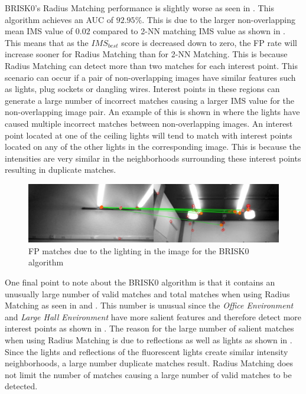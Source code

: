 \documentclass{report}
\begin{document}
BRISK0's Radius Matching performance is slightly worse as seen in . This algorithm achieves an AUC of $92.95\%$. This is due to the larger non-overlapping mean IMS value of $0.02$ compared to 2-NN matching IMS value as shown in . This means that as the $IMS_{best}$ score is decreased down to zero, the FP rate will increase sooner for Radius Matching than for 2-NN Matching. This is because Radius Matching can detect more than two matches for each interest point. This scenario can occur if a pair of non-overlapping images have similar features such as lights, plug sockets or dangling wires. Interest points in these regions can generate a large number of incorrect matches causing a larger IMS value for the non-overlapping image pair. An example of this is shown in  where the lights have caused multiple incorrect matches between non-overlapping images. An interest point located at one of the ceiling lights will tend to match with interest points located on any of the other lights in the corresponding image. This is because the intensities are very similar in the neighborhoods surrounding these interest points resulting in duplicate matches. \\

\begin{figure}
  \centering
    \includegraphics[width=1.0\textwidth]{../Drawings/Matching/fpMatchBRISK0.jpg}
    \caption{FP matches due to the lighting in the image for the BRISK0 algorithm} 
    \label{fig:duplicateMatchesBrisk0}
\end{figure}

One final point to note about the BRISK0 algorithm is that it contains an unusually large number of valid matches and total matches when using Radius Matching as seen in  and . This number is unusual since the \textit{Office Environment} and \textit{Large Hall Environment} have more salient features and therefore detect more interest points as shown in . The reason for the large number of salient matches when using Radius Matching is due to reflections as well as lights as shown in . Since the lights and reflections of the fluorescent lights create similar intensity neighborhoods, a large number duplicate matches result. Radius Matching does not limit the number of matches causing a large number of valid matches to be detected.\\
\end{document}
